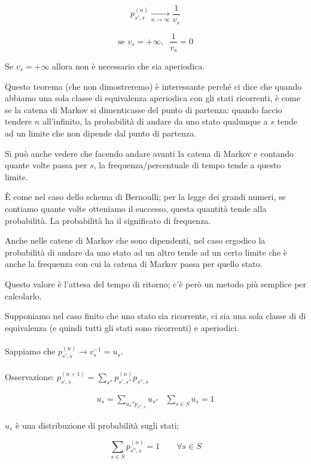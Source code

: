 \documentclass[a4paper,12pt]{book}
\begin{document}
$$ p_{s',s}^{(n)} \underset{n \to \infty}{\longrightarrow} \frac{1}{v_s} $$

$$ \text{se } v_s = +\infty, \; \; \frac{1}{v_s} = 0 $$

Se $ v_s = +\infty $ allora non è necessario che sia aperiodica. 

Questo teorema (che non dimostreremo) è interessante perché ci dice che quando abbiamo una sola classe di equivalenza aperiodica con gli stati ricorrenti, è come se la catena di Markov si dimenticasse del punto di partenza: quando faccio tendere $ n $ all'infinito, la probabilità di andare da uno stato qualunque a $ s $ tende ad un limite che non dipende dal punto di partenza.

Si può anche vedere che facendo andare avanti la catena di Markov e contando quante volte passa per $ s $, la frequenza/percentuale di tempo tende a questo limite. 

È come nel caso dello schema di Bernoulli; per la legge dei grandi numeri, se contiamo quante volte otteniamo il successo, questa quantità tende alla probabilità. La probabilità ha il significato di frequenza.

Anche nelle catene di Markov che sono dipendenti, nel caso ergodico la probabilità di andare da uno stato ad un altro tende ad un certo limite che è anche la frequenza con cui la catena di Markov passa per quello stato. 

Questo valore è l'attesa del tempo di ritorno; c'è però un metodo più semplice per calcolarlo. 

Supponiamo nel caso finito che uno stato sia ricorrente, ci sia una sola classe di di equivalenza (e quindi tutti gli stati sono ricorrenti) e aperiodici. 
\\ \\
Sappiamo che $ p_{s',s}^{(n)} \to v_s^{-1} = u_s $.
\\ \\
Osservazione: $ p_{s',s}^{(n+1)} = \sum_{s''} p_{s',s''}^{(n)} p_{s'',s} $

$$ \begin{array}{cc}
	
	u_s = \sum_{u_s''p_{s'',s}} u_{s''} & \sum_{s \in S} u_s = 1
\end{array} $$

$ u_s $ è una distribuzione di probabilità sugli stati;

$$ \sum_{s \in S} p_{s'', s}^{(n)} = 1 \qquad \forall s \in S $$
\end{document}
